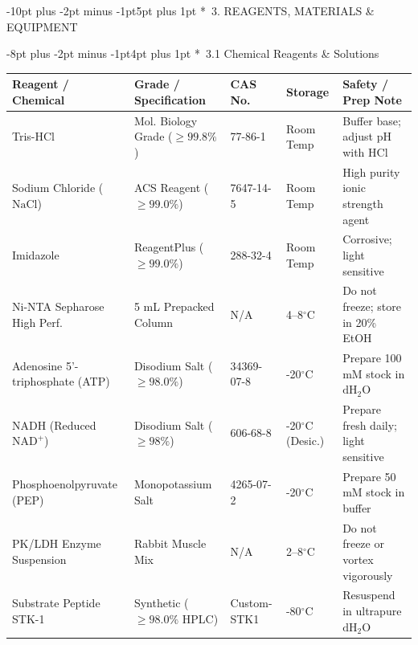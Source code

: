 \documentclass[10pt,a4paper]{article}
\makeatletter
\renewcommand\section{\@startsection{section}{1}{\z@}%
  {-10pt plus -2pt minus -1pt}{5pt plus 1pt}%
  {\normalfont\large\bfseries\color{SopNavy}}}
\renewcommand\subsection{\@startsection{subsection}{2}{\z@}%
  {-8pt plus -2pt minus -1pt}{4pt plus 1pt}%
  {\normalfont\small\bfseries\color{SopTeal}}}
\makeatother
\begin{document}
\section*{\faFlask\ 3. REAGENTS, MATERIALS \& EQUIPMENT}

\subsection*{\faList\ 3.1 Chemical Reagents \& Solutions}

\begin{table}[h!]
  \centering
  \scriptsize
  \renewcommand{\arraystretch}{1.15}
  \begin{tabularx}{\textwidth}{|Y|p{3.2cm}|p{1.8cm}|p{1.8cm}|Y|}
    \hline
    \color{white}\textbf{Reagent / Chemical} & \color{white}\textbf{Grade / Specification} & \color{white}\textbf{CAS No.} & \color{white}\textbf{Storage} & \color{white}\textbf{Safety / Prep Note} \\ \hline
    Tris-HCl & Mol. Biology Grade ($\ge 99.8\%$) & 77-86-1 & Room Temp & Buffer base; adjust pH with HCl \\ \hline
    Sodium Chloride ($\text{NaCl}$) & ACS Reagent ($\ge 99.0\%$) & 7647-14-5 & Room Temp & High purity ionic strength agent \\ \hline
    Imidazole & ReagentPlus ($\ge 99.0\%$) & 288-32-4 & Room Temp & Corrosive; light sensitive \\ \hline
    Ni-NTA Sepharose High Perf. & 5 mL Prepacked Column & N/A & 4--8$^\circ$C & Do not freeze; store in 20\% EtOH \\ \hline
    Adenosine 5'-triphosphate (ATP) & Disodium Salt ($\ge 98.0\%$) & 34369-07-8 & -20$^\circ$C & Prepare 100 mM stock in $\text{dH}_2\text{O}$ \\ \hline
    NADH (Reduced $\text{NAD}^+$) & Disodium Salt ($\ge 98\%$) & 606-68-8 & -20$^\circ$C (Desic.) & Prepare fresh daily; light sensitive \\ \hline
    Phosphoenolpyruvate (PEP) & Monopotassium Salt & 4265-07-2 & -20$^\circ$C & Prepare 50 mM stock in buffer \\ \hline
    PK/LDH Enzyme Suspension & Rabbit Muscle Mix & N/A & 2--8$^\circ$C & Do not freeze or vortex vigorously \\ \hline
    Substrate Peptide STK-1 & Synthetic ($\ge 98.0\%$ HPLC) & Custom-STK1 & -80$^\circ$C & Resuspend in ultrapure $\text{dH}_2\text{O}$ \\ \hline
  \end{tabularx}
\end{table}
\end{document}
